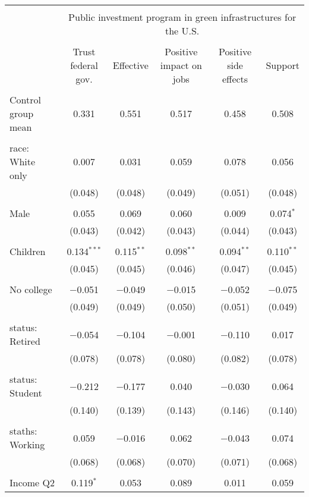 
\begin{tabular}{@{\extracolsep{5pt}}lccccc} 
\\[-1.8ex]\hline 
\hline \\[-1.8ex] 
 & \multicolumn{5}{c}{Public investment program in green infrastructures for the U.S.} \\ 
\cline{2-6} 
\\[-1.8ex] & Trust federal gov. & Effective & Positive impact on jobs & Positive side effects & Support \\ 
\hline \\[-1.8ex] 
 Control group mean & 0.331 & 0.551 & 0.517 & 0.458 & 0.508  \\ \hline \\[-1.8ex] race: White only & 0.007 & 0.031 & 0.059 & 0.078 & 0.056 \\ 
  & (0.048) & (0.048) & (0.049) & (0.051) & (0.048) \\ 
  & & & & & \\ 
 Male & 0.055 & 0.069 & 0.060 & 0.009 & 0.074$^{*}$ \\ 
  & (0.043) & (0.042) & (0.043) & (0.044) & (0.043) \\ 
  & & & & & \\ 
 Children & 0.134$^{***}$ & 0.115$^{**}$ & 0.098$^{**}$ & 0.094$^{**}$ & 0.110$^{**}$ \\ 
  & (0.045) & (0.045) & (0.046) & (0.047) & (0.045) \\ 
  & & & & & \\ 
 No college & $-$0.051 & $-$0.049 & $-$0.015 & $-$0.052 & $-$0.075 \\ 
  & (0.049) & (0.049) & (0.050) & (0.051) & (0.049) \\ 
  & & & & & \\ 
 status: Retired & $-$0.054 & $-$0.104 & $-$0.001 & $-$0.110 & 0.017 \\ 
  & (0.078) & (0.078) & (0.080) & (0.082) & (0.078) \\ 
  & & & & & \\ 
 status: Student & $-$0.212 & $-$0.177 & 0.040 & $-$0.030 & 0.064 \\ 
  & (0.140) & (0.139) & (0.143) & (0.146) & (0.140) \\ 
  & & & & & \\ 
 staths: Working & 0.059 & $-$0.016 & 0.062 & $-$0.043 & 0.074 \\ 
  & (0.068) & (0.068) & (0.070) & (0.071) & (0.068) \\ 
  & & & & & \\ 
 Income Q2 & 0.119$^{*}$ & 0.053 & 0.089 & 0.011 & 0.059 \\ 

\end{tabular}
